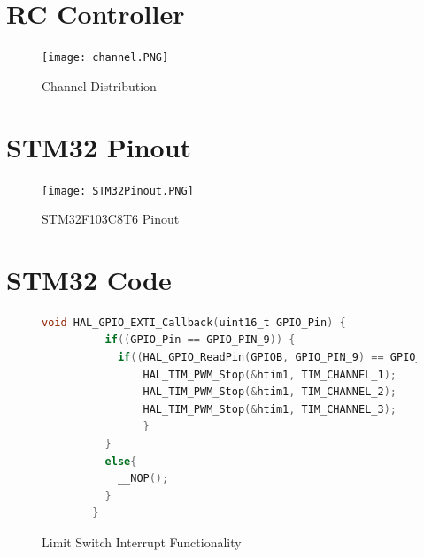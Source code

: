 \documentclass{report}
\begin{document}
    \newpage

    \section{RC Controller}
    \begin{figure}[ht!]
      \begin{center}
          \texttt{[image: channel.PNG]}\\
          \caption{ Channel Distribution  } 
          \label{fig:RCController}
      \end{center}
    \end{figure}

    \newpage

    \section{STM32 Pinout}

    \begin{figure}[ht!]
      \begin{center}
          \texttt{[image: STM32Pinout.PNG]}\\
          \caption{ STM32F103C8T6 Pinout } 
          \label{fig:STM32Pinout}
      \end{center}
    \end{figure}

    \newpage

    \section{STM32 Code}

    \begin{figure}
      \begin{lstlisting}[language=C]
        void HAL_GPIO_EXTI_Callback(uint16_t GPIO_Pin) {
          if((GPIO_Pin == GPIO_PIN_9)) {
            if((HAL_GPIO_ReadPin(GPIOB, GPIO_PIN_9) == GPIO_PIN_SET)){
                HAL_TIM_PWM_Stop(&htim1, TIM_CHANNEL_1);
                HAL_TIM_PWM_Stop(&htim1, TIM_CHANNEL_2);
                HAL_TIM_PWM_Stop(&htim1, TIM_CHANNEL_3);
                }
          }
          else{
            __NOP();
          }
        }
        \end{lstlisting}
        \caption{Limit Switch Interrupt Functionality}
        \label{fig:interrupt}
    \end{figure}
\end{document}
